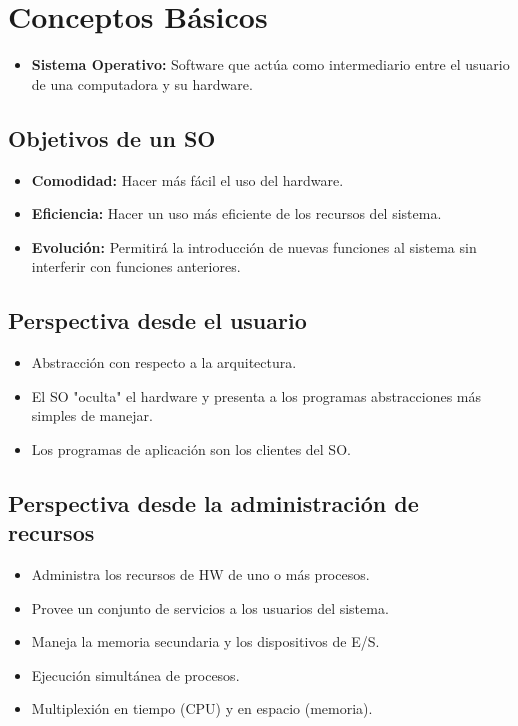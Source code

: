 \pagebreak

\section{Conceptos Básicos}
\begin{itemize}
    \item \textbf{Sistema Operativo:} Software que actúa como intermediario entre el usuario de una computadora y su hardware.
\end{itemize}

\subsection{Objetivos de un SO}
\begin{itemize}
    \item \textbf{Comodidad:} Hacer más fácil el uso del hardware.
    \item \textbf{Eficiencia:} Hacer un uso más eficiente de los recursos del sistema.
    \item \textbf{Evolución:} Permitirá la introducción de nuevas funciones al sistema sin interferir con funciones anteriores.
\end{itemize}

\subsection{Perspectiva desde el usuario}
\begin{itemize}
    \item Abstracción con respecto a la arquitectura.
    \item El SO "oculta" el hardware y presenta a los programas abstracciones más simples de manejar.
    \item Los programas de aplicación son los clientes del SO.
\end{itemize}

\subsection{Perspectiva desde la administración de recursos}
\begin{itemize}
    \item Administra los recursos de HW de uno o más procesos.
    \item Provee un conjunto de servicios a los usuarios del sistema.
    \item Maneja la memoria secundaria y los dispositivos de E/S.
    \item Ejecución simultánea de procesos.
    \item Multiplexión en tiempo (CPU) y en espacio (memoria).
\end{itemize}

